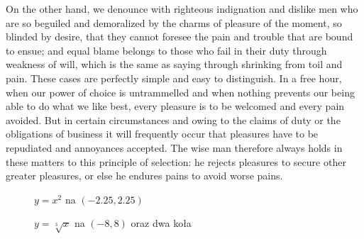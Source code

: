 \documentclass[a4paper, 12pt]{amsart}
\begin{document}
On the other hand, we denounce with righteous indignation and dislike men who are so beguiled and demoralized by the charms of pleasure of the moment, so blinded by desire, that they cannot foresee the pain and trouble that are bound to ensue; and equal blame belongs to those who fail in their duty through weakness of will, which is the same as saying through shrinking from toil and pain. These cases are perfectly simple and easy to distinguish. In a free hour, when our power of choice is untrammelled and when nothing prevents our being able to do what we like best, every pleasure is to be welcomed and every pain avoided. But in certain circumstances and owing to the claims of duty or the obligations of business it will frequently occur that pleasures have to be repudiated and annoyances accepted. The wise man therefore always holds in these matters to this principle of selection: he rejects pleasures to secure other greater pleasures, or else he endures pains to avoid worse pains.

\begin{figure}[H]
\centering
{}
\caption{$y=x^2$ na $(-2.25, 2.25)$}
\end{figure}

\begin{figure}[H]
\centering
{}
\caption{$y=\sqrt[3]{x}$ na $(-8, 8)$ oraz dwa koła}
\end{figure}
\end{document}
